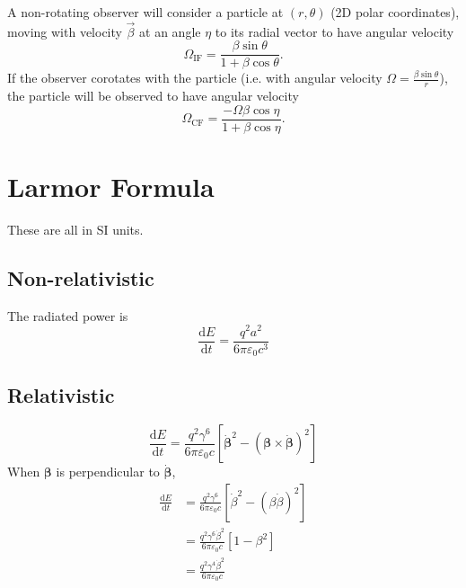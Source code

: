 \documentclass{book}
\newcommand{\deriv}[2]{\frac{\text{d}{#1}}{\text{d}{#2}}}
\begin{document}
A non-rotating observer will consider a particle at $(r,\theta)$ (2D polar coordinates), moving with velocity $\vec{\beta}$ at an angle $\eta$ to its radial vector to have angular velocity
\begin{equation}
    \Omega_\text{IF} = \frac{\beta\sin\theta}{1 + \beta\cos\theta}.
    \label{eqn:angular_rate_IF}
\end{equation}
If the observer corotates with the particle (i.e. with angular velocity $\Omega = \frac{\beta\sin\theta}{r}$), the particle will be observed to have angular velocity
\begin{equation}
    \Omega_\text{CF} = \frac{-\Omega\beta\cos\eta}{1+\beta\cos\eta}.
    \label{eqn:angular_rate_CF}
\end{equation}

\section{Larmor Formula}

These are all in SI units.

\subsection{Non-relativistic}

The radiated power is
\begin{equation}
    \deriv{E}{t} = \frac{q^2a^2}{6\pi\varepsilon_0 c^3}
\end{equation}

\subsection{Relativistic}

\begin{equation}
    \deriv{E}{t} = \frac{q^2\gamma^6}{6\pi\varepsilon_0 c}
        \left[\dot{\pmb{\beta}}^2 - (\pmb{\beta}\times\dot{\pmb{\beta}})^2\right]
\end{equation}
When $\pmb{\beta}$ is perpendicular to $\dot{\pmb{\beta}}$,
\begin{equation}
\begin{aligned}
    \deriv{E}{t}
        &= \frac{q^2\gamma^6}{6\pi\varepsilon_0 c}
            \left[\dot{\beta}^2 - (\beta\dot{\beta})^2\right] \\
        &= \frac{q^2\gamma^6\dot{\beta}^2}{6\pi\varepsilon_0 c}
            \left[1 - \beta^2\right] \\
        &= \frac{q^2\gamma^4\dot{\beta}^2}{6\pi\varepsilon_0 c}
\end{aligned}
\end{equation}
\end{document}
